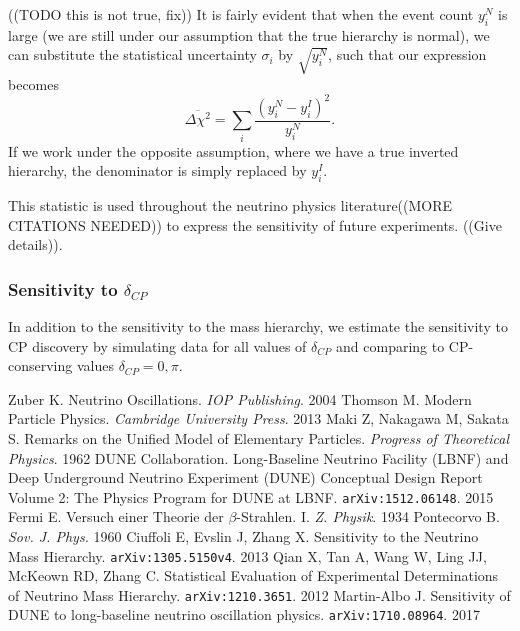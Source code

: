 \documentclass[10pt, a4paper]{article}
\begin{document}
((TODO this is not true, fix))
It is fairly evident\cite{qian} that when the
event count $y^N_i$ is large (we are still under our assumption that the true hierarchy
is normal), we can substitute the statistical uncertainty $\sigma_i$ by
$\sqrt{y^N_i}$, such that our expression becomes
$$\overline{\Delta\chi^2} = \sum_i \frac{(y^N_i - y^I_i)^2}{y^N_i}.$$
If we work under the opposite assumption, where we have a true inverted
hierarchy, the denominator is simply replaced by $y^I_i$. 

This statistic is used throughout the neutrino physics literature\cite{cdr,
martin-albo}((MORE CITATIONS NEEDED)) to express the sensitivity of future experiments.
((Give details)).



\subsubsection{Sensitivity to $\delta_{CP}$}
In addition to the sensitivity to the mass hierarchy, we estimate the
sensitivity to CP discovery by simulating data for all values of $\delta_{CP}$
and comparing to CP-conserving values $\delta_{CP} = 0, \pi$.



\begin{thebibliography}{20} 
	 Zuber K. Neutrino
		Oscillations. \textit{IOP Publishing}. 2004
	 Thomson M. Modern Particle Physics. \textit{Cambridge
		University Press}. 2013
	 Maki Z, Nakagawa M, Sakata S. Remarks on the Unified Model of
		Elementary Particles. \textit{Progress of Theoretical Physics}. 1962
	 DUNE Collaboration. Long-Baseline Neutrino Facility (LBNF) and
		Deep Underground Neutrino Experiment (DUNE) Conceptual Design Report Volume
		2: The Physics Program for DUNE at LBNF. \texttt{arXiv:1512.06148}. 2015
	 Fermi E. Versuch einer Theorie der $\beta$-Strahlen. I.
		\textit{Z. Physik}. 1934
	 Pontecorvo B. \textit{Sov. J. Phys.} 1960
	 Ciuffoli E, Evslin J, Zhang X. Sensitivity to the
		Neutrino Mass Hierarchy. \texttt{arXiv:1305.5150v4}. 2013
	 Qian X, Tan A, Wang W, Ling JJ, McKeown RD, Zhang C.
		Statistical Evaluation of Experimental Determinations of Neutrino Mass
		Hierarchy. \texttt{arXiv:1210.3651}. 2012
	 Martin-Albo J. Sensitivity of DUNE to long-baseline
		neutrino oscillation physics. \texttt{arXiv:1710.08964}. 2017
	
\end{thebibliography} 
\end{document}

